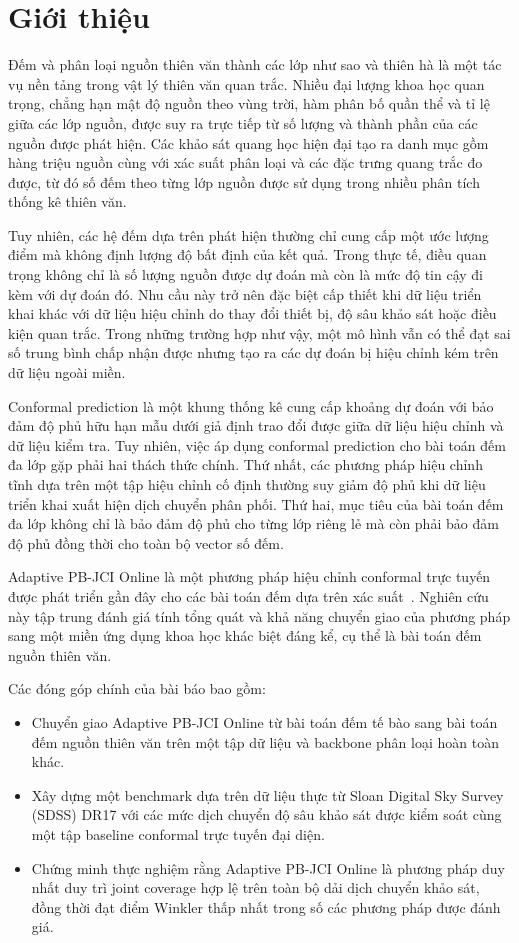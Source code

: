 \documentclass[pdflatex,sn-mathphys-num]{sn-jnl}
\begin{document}
\section{Giới thiệu}\label{sec:intro}

Đếm và phân loại nguồn thiên văn thành các lớp như sao và thiên hà là một tác vụ nền tảng trong vật lý thiên
văn quan trắc. Nhiều đại lượng khoa học quan trọng, chẳng hạn mật độ nguồn theo vùng trời, hàm phân bố quần
thể và tỉ lệ giữa các lớp nguồn, được suy ra trực tiếp từ số lượng và thành phần của các nguồn được phát
hiện. Các khảo sát quang học hiện đại tạo ra danh mục gồm hàng triệu nguồn cùng với xác suất phân loại và các
đặc trưng quang trắc đo được, từ đó số đếm theo từng lớp nguồn được sử dụng trong nhiều phân tích thống kê
thiên văn.

Tuy nhiên, các hệ đếm dựa trên phát hiện thường chỉ cung cấp một ước lượng điểm mà không định lượng độ bất
định của kết quả. Trong thực tế, điều quan trọng không chỉ là số lượng nguồn được dự đoán mà còn là mức độ
tin cậy đi kèm với dự đoán đó. Nhu cầu này trở nên đặc biệt cấp thiết khi dữ liệu triển khai khác với dữ liệu
hiệu chỉnh do thay đổi thiết bị, độ sâu khảo sát hoặc điều kiện quan trắc. Trong những trường hợp như vậy,
một mô hình vẫn có thể đạt sai số trung bình chấp nhận được nhưng tạo ra các dự đoán bị hiệu chỉnh kém trên
dữ liệu ngoài miền.

Conformal prediction là một khung thống kê cung cấp khoảng dự đoán với bảo đảm độ phủ hữu hạn mẫu dưới giả
định trao đổi được giữa dữ liệu hiệu chỉnh và dữ liệu kiểm tra. Tuy nhiên, việc áp dụng conformal prediction
cho bài toán đếm đa lớp gặp phải hai thách thức chính. Thứ nhất, các phương pháp hiệu chỉnh tĩnh dựa trên một
tập hiệu chỉnh cố định thường suy giảm độ phủ khi dữ liệu triển khai xuất hiện dịch chuyển phân phối. Thứ
hai, mục tiêu của bài toán đếm đa lớp không chỉ là bảo đảm độ phủ cho từng lớp riêng lẻ mà còn phải bảo đảm
độ phủ đồng thời cho toàn bộ vector số đếm.

Adaptive PB-JCI Online là một phương pháp hiệu chỉnh conformal trực tuyến được phát triển gần đây cho các bài
toán đếm dựa trên xác suất~\cite{dinh2026adaptive}. Nghiên cứu này tập trung đánh giá tính tổng quát và khả
năng chuyển giao của phương pháp sang một miền ứng dụng khoa học khác biệt đáng kể, cụ thể là bài toán đếm
nguồn thiên văn.

Các đóng góp chính của bài báo bao gồm:
\begin{itemize}
\item Chuyển giao Adaptive PB-JCI Online từ bài toán đếm tế bào sang bài toán đếm nguồn thiên văn trên một
tập dữ liệu và backbone phân loại hoàn toàn khác.
\item Xây dựng một benchmark dựa trên dữ liệu thực từ Sloan Digital Sky Survey (SDSS) DR17 với các mức dịch
chuyển độ sâu khảo sát được kiểm soát cùng một tập baseline conformal trực tuyến đại diện.
\item Chứng minh thực nghiệm rằng Adaptive PB-JCI Online là phương pháp duy nhất duy trì joint coverage hợp
lệ trên toàn bộ dải dịch chuyển khảo sát, đồng thời đạt điểm Winkler thấp nhất trong số các phương pháp được
đánh giá.
\end{itemize}
\end{document}
